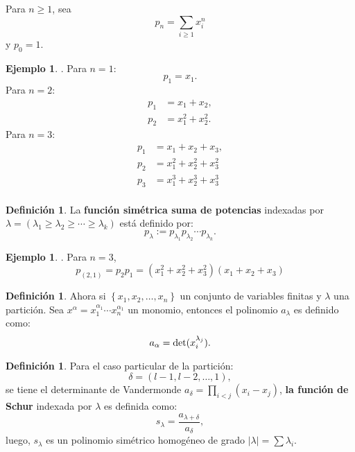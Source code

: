 \documentclass[12pt]{book}
\theoremstyle{definition}
\newtheorem{definition}[theorem]{Definición}
\newtheorem{example}[theorem]{Ejemplo}
\newcounter{in}
\newcounter{ini}
\begin{document}
Para $n \geq 1$, sea
\begin{equation}
  \label{eq:99}
  p_n = \sum_{i \geq 1} x_{i}^{n}
\end{equation}
y $p_0 = 1$.
\begin{example}.
Para $n = 1$:
\begin{equation*}
p_{1} = x_{1}.
\end{equation*}
Para $n = 2$:
\begin{equation*}
\begin{aligned}
p_{1} &= x_{1} + x_{2}, \\
p_{2} &= x_{1}^{2} + x_{2}^{2}.
\end{aligned}
\end{equation*}
Para $n = 3$:
\begin{equation*}
\begin{aligned}
p_{1} &= x_{1} + x_{2} + x_{3},\\
p_{2} &= x_{1}^{2} + x_{2}^{2} + x_{3}^{2} \\
p_{3} &= x_{1}^{3} + x_{2}^{3} + x_{3}^{3} \\
\end{aligned}
\end{equation*}
\end{example}
\begin{definition}
La \textbf{función simétrica suma de potencias} indexadas por
$\lambda = (\lambda_1 \geq \lambda_2 \geq \cdots \geq \lambda_k)$ está
definido por:
\begin{equation}
  \label{eq:100}
  p_{\lambda} := p_{\lambda_1}p_{\lambda_2} \cdots p_{\lambda_k}.
\end{equation}
\end{definition}
\begin{example}.
Para $n = 3$,
\begin{equation*}
p_{(2,1)} = p_{2}p_{1} = (x_{1}^{2} + x_{2}^{2} + x_{3}^{2})(x_{1} + x_{2} + x_{3})
\end{equation*}
\end{example}
\begin{definition}
Ahora si $\left \{ x_{1}, x_{2}, \ldots, x_{n} \right \}$ un conjunto de variables finitas y $\lambda$ una partición. Sea $x^{\alpha}=x_{1}^{\alpha_{1}}\cdots x_{n}^{\alpha_{1}}$ un monomio, entonces el polinomio $a_{\lambda}$ es definido como:
\begin{equation*}
a_{\alpha} = \textup{det}(x_{i}^{\lambda_{j}}).
\end{equation*}
\end{definition}
\begin{definition}
Para el caso particular de la partición:
\begin{equation*}
\delta = (l-1,l-2,\ldots,1),
\end{equation*} 
se tiene el determinante de Vandermonde $a_{\delta} = \prod_{i < j} (x_{i}-x_{j})$, \textbf{la función
de Schur} indexada por $\lambda$ es definida como:
\begin{equation*}
s_{\lambda} = \frac{a_{\lambda + \delta}}{a_{\delta}},
\end{equation*}
luego, $s_{\lambda}$ es un polinomio simétrico homogéneo de grado $|\lambda| = \sum \lambda_{i}$.
\end{definition}
\end{document}
